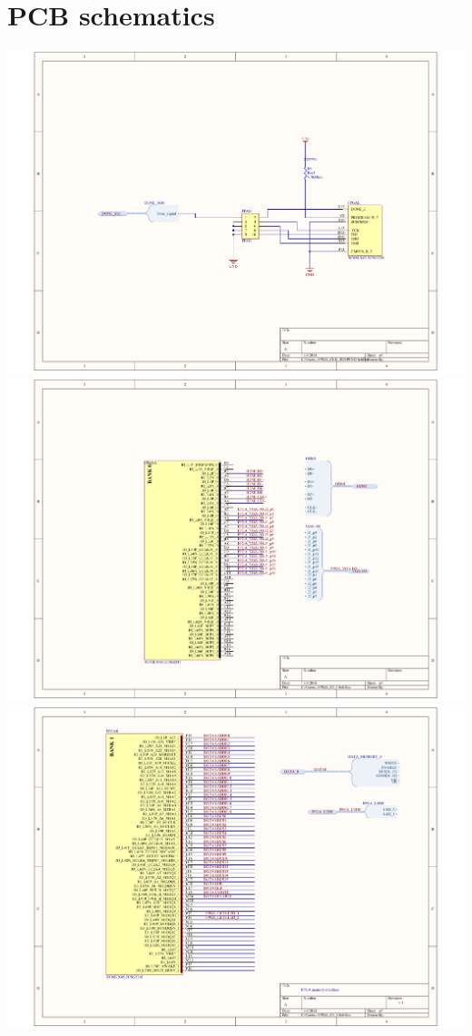 \documentclass[../main/report.tex]{subfiles}
\begin{document}
\chapter{PCB schematics}
\newpage
\includegraphics[width=\paperwidth]{../appendix/PCB_schematics/FPGA_CLK_SUSPEND.PDF}
\newpage
\includegraphics[width=\paperwidth]{../appendix/PCB_schematics/FPGA_IO_1.PDF}
\newpage
\includegraphics[width=\paperwidth]{../appendix/PCB_schematics/FPGA_IO_2.PDF}
\end{document}
